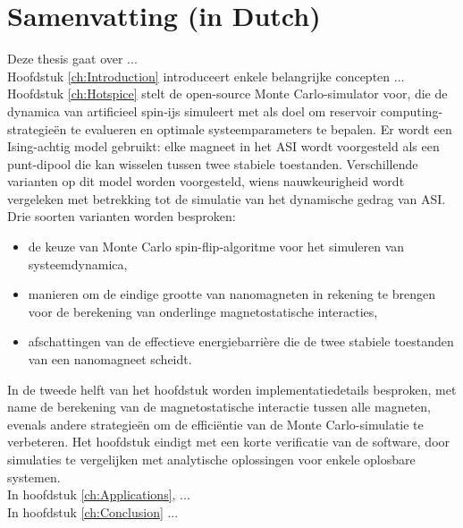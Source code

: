 \chapter*{Samenvatting (in Dutch)}

Deze thesis gaat over ... \\

Hoofdstuk \ref{ch:Introduction} introduceert enkele belangrijke concepten ... \\

Hoofdstuk \ref{ch:Hotspice} stelt de open-source \hotspice Monte Carlo-simulator voor, die de dynamica van artificieel spin-ijs simuleert met als doel om reservoir computing-strategieën te evalueren en optimale systeemparameters te bepalen.
Er wordt een Ising-achtig model gebruikt: elke magneet in het ASI wordt voorgesteld als een punt-dipool die kan wisselen tussen twee stabiele toestanden.
Verschillende varianten op dit model worden voorgesteld, wiens nauwkeurigheid wordt vergeleken met betrekking tot de simulatie van het dynamische gedrag van ASI.
Drie soorten varianten worden besproken:
\begin{itemize}[noitemsep,nolistsep] %
	\item de keuze van Monte Carlo spin-flip-algoritme voor het simuleren van systeemdynamica,
	\item manieren om de eindige grootte van nanomagneten in rekening te brengen voor de berekening van onderlinge magnetostatische interacties,
	\item afschattingen van de effectieve energiebarri\`ere die de twee stabiele toestanden van een nanomagneet scheidt.
\end{itemize}
In de tweede helft van het hoofdstuk worden implementatiedetails besproken, met name de berekening van de magnetostatische interactie tussen alle magneten, evenals andere strategie\"en om de effici\"entie van de Monte Carlo-simulatie te verbeteren.
Het hoofdstuk eindigt met een korte verificatie van de software, door simulaties te vergelijken met analytische oplossingen voor enkele oplosbare systemen. \\

In hoofdstuk \ref{ch:Applications}, ... \\

In hoofdstuk \ref{ch:Conclusion} ...
